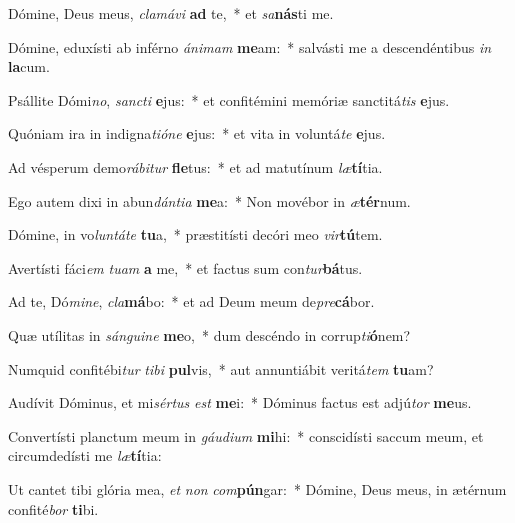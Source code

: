\item Dómine, Deus meus, \textit{cla}\textit{má}\textit{vi} \textbf{ad} te,~* et \textit{sa}\textbf{nás}ti me.
\item Dómine, eduxísti ab inférno \textit{á}\textit{ni}\textit{mam} \textbf{me}am:~* salvásti me a descendéntibus \textit{in} \textbf{la}cum.
\item Psállite Dómi\textit{no}, \textit{sanc}\textit{ti} \textbf{e}jus:~* et confitémini memóriæ sanctitá\textit{tis} \textbf{e}jus.
\item Quóniam ira in indigna\textit{ti}\textit{ó}\textit{ne} \textbf{e}jus:~* et vita in voluntá\textit{te} \textbf{e}jus.
\item Ad vésperum demo\textit{rá}\textit{bi}\textit{tur} \textbf{fle}tus:~* et ad matutínum \textit{læ}\textbf{tí}tia.
\item Ego autem dixi in abun\textit{dán}\textit{ti}\textit{a} \textbf{me}a:~* Non movébor in \textit{æ}\textbf{tér}num.
\item Dómine, in vo\textit{lun}\textit{tá}\textit{te} \textbf{tu}a,~* præstitísti decóri meo \textit{vir}\textbf{tú}tem.
\item Avertísti fáci\textit{em} \textit{tu}\textit{am} \textbf{a} me,~* et factus sum con\textit{tur}\textbf{bá}tus.
\item Ad te, Dó\textit{mi}\textit{ne}, \textit{cla}\textbf{má}bo:~* et ad Deum meum de\textit{pre}\textbf{cá}bor.
\item Quæ utílitas in \textit{sán}\textit{gui}\textit{ne} \textbf{me}o,~* dum descéndo in corrup\textit{ti}\textbf{ó}nem?
\item Numquid confitébi\textit{tur} \textit{ti}\textit{bi} \textbf{pul}vis,~* aut annuntiábit veritá\textit{tem} \textbf{tu}am?
\item Audívit Dóminus, et mi\textit{sér}\textit{tus} \textit{est} \textbf{me}i:~* Dóminus factus est adjú\textit{tor} \textbf{me}us.
\item Convertísti planctum meum in \textit{gáu}\textit{di}\textit{um} \textbf{mi}hi:~* conscidísti saccum meum, et circumdedísti me \textit{læ}\textbf{tí}tia:
\item Ut cantet tibi glória mea, \textit{et} \textit{non} \textit{com}\textbf{pún}gar:~* Dómine, Deus meus, in ætérnum confité\textit{bor} \textbf{ti}bi.
